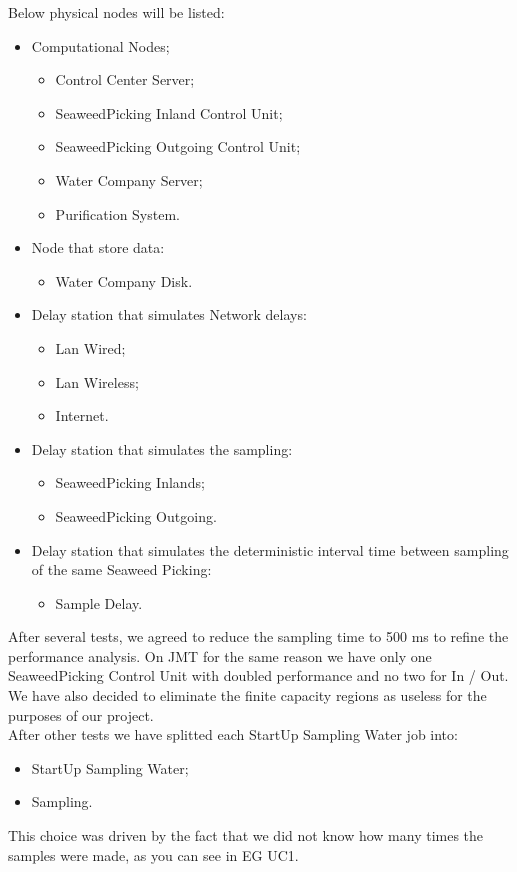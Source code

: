 Below physical nodes will be listed:
\begin{itemize}
\item Computational Nodes;
\begin{itemize}
	\item Control Center Server;
	\item SeaweedPicking Inland Control Unit;
	\item SeaweedPicking Outgoing Control Unit;
	\item Water Company Server;
	\item Purification System.
\end{itemize}
\item Node that store data:
\begin{itemize}
	\item Water Company Disk.
\end{itemize}	
\item Delay station that simulates Network delays:
\begin{itemize}
	\item Lan Wired;
	\item Lan Wireless;
	\item Internet.
\end{itemize}	
\item Delay station that simulates the sampling:
\begin{itemize}
	\item SeaweedPicking Inlands;
	\item SeaweedPicking Outgoing.
\end{itemize}
\item Delay station that simulates the deterministic interval time 		between sampling of the same Seaweed Picking:
\begin{itemize}
	\item Sample Delay.
\end{itemize}
\end{itemize}

\bigskip
After several tests, we agreed to reduce the sampling time to 500 ms to refine the performance analysis. On JMT for the same reason we have only one SeaweedPicking Control Unit with doubled performance and no two for In / Out.\\
We have also decided to eliminate the finite capacity regions as useless for the purposes of our project. \\
After other tests we have splitted each StartUp Sampling Water job into:
\begin{itemize}
	\item StartUp Sampling Water;
	\item Sampling.
\end{itemize}
This choice was driven by the fact that we did not know how many times the samples were made, as you can see in EG UC1.

